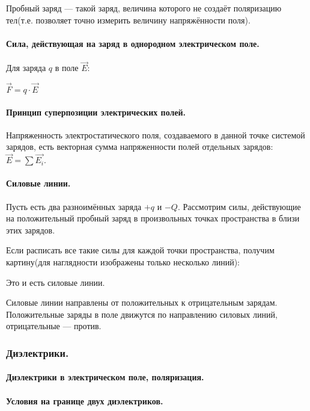 \documentclass{article}
\begin{document}
                Пробный заряд --- такой заряд, величина которого не создаёт поляризацию тел(т.е. позволяет точно измерить величину напряжённости поля).
            \paragraph{Сила, действующая на заряд в однородном электрическом поле.}
                Для заряда \(q\) в поле \(\vec E\):

                \(\vec F = q \cdot \vec E\)
            \paragraph{Принцип суперпозиции электрических полей.}
                Напряженность электростатического поля, создаваемого в данной точке системой зарядов, есть векторная сумма напряженности полей отдельных зарядов: \(\vec E = \sum{\vec{E_i}}\).
            \paragraph{Силовые линии.}
                Пусть есть два разноимённых заряда \(+q\) и \(-Q\). Рассмотрим силы, действующие на положительный пробный заряд в произвольных точках пространства в близи этих зарядов.
                

                Если расписать все такие силы для каждой точки пространства, получим картину(для наглядности изображены только несколько линий):
                

                Это и есть силовые линии.

                Силовые линии направлены от положительных к отрицательным зарядам. Положительные заряды в поле движутся по направлению силовых линий, отрицательные --- против.
        \subsubsection{Диэлектрики.}
            \paragraph{Диэлектрики в электрическом поле, поляризация.}

            \paragraph{Условия на границе двух диэлектриков.}
\end{document}
